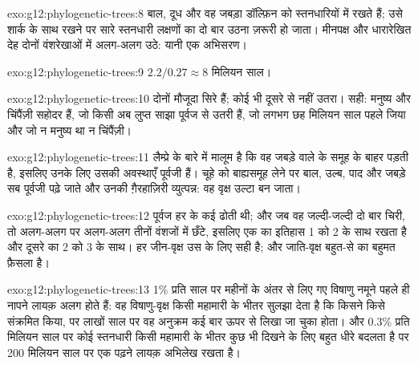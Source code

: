 \begin{solution}{exo:g12:phylogenetic-trees:8}
बाल, दूध और वह जबड़ा डॉल्फ़िन को स्तनधारियों में रखते हैं; उसे शार्क के साथ
रखने पर सारे स्तनधारी लक्षणों का दो बार उठना ज़रूरी हो जाता। मीनपक्ष और
धारारेखित देह दोनों वंशरेखाओं में अलग-अलग उठे: यानी एक अभिसरण।
\end{solution}

\begin{solution}{exo:g12:phylogenetic-trees:9}
$2.2/0.27 \approx 8$ मिलियन साल।
\end{solution}

\begin{solution}{exo:g12:phylogenetic-trees:10}
दोनों मौजूदा सिरे हैं; कोई भी दूसरे से नहीं उतरा। सही: मनुष्य और चिंपैंज़ी
सहोदर  हैं, जो किसी अब लुप्त साझा पूर्वज से उतरी हैं, जो लगभग छह
मिलियन साल पहले जिया और जो न मनुष्य था न चिंपैंज़ी।
\end{solution}

\begin{solution}{exo:g12:phylogenetic-trees:11}
लैम्प्रे के बारे में मालूम है कि वह जबड़े वाले  के समूह के बाहर
पड़ती है, इसलिए उनके लिए उसकी अवस्थाएँ पूर्वजी हैं। चूहे को बाह्यसमूह लेने
पर बाल, उल्ब, पाद और जबड़े सब पूर्वजी पढ़े जाते और उनकी ग़ैरहाज़िरी
व्युत्पन्न: वह वृक्ष उल्टा बन जाता।
\end{solution}

\begin{solution}{exo:g12:phylogenetic-trees:12}
पूर्वज  हर  के कई  ढोती थी; और जब वह जल्दी-जल्दी दो बार
चिरी, तो अलग-अलग  पर अलग-अलग  तीनों वंशजों में छँटे,
इसलिए एक  का इतिहास  1 को 2 के साथ रखता है और दूसरे का 2 को 3 के
साथ। हर जीन-वृक्ष उस  के लिए सही है; और जाति-वृक्ष बहुत-से  का
बहुमत फ़ैसला है।
\end{solution}

\begin{solution}{exo:g12:phylogenetic-trees:13}
1\% प्रति साल पर महीनों के अंतर से लिए गए विषाणु नमूने पहले ही नापने लायक़
अलग होते हैं: वह विषाणु-वृक्ष किसी महामारी के भीतर सुलझा देता है कि किसने
किसे संक्रमित किया, पर लाखों साल पर वह अनुक्रम कई बार ऊपर से लिखा जा चुका
होता। और 0.3\% प्रति मिलियन साल पर कोई स्तनधारी  किसी महामारी के भीतर
कुछ भी दिखने के लिए बहुत धीरे बदलता है पर 200 मिलियन साल पर एक पढ़ने लायक़
अभिलेख रखता है।
\end{solution}

